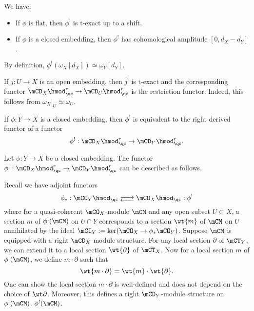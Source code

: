 	\begin{rem}
		We have:
		\begin{itemize}
			\item If $\phi$ is flat, then $\phi^!$ is t-exact up to a shift.
			\item If $\phi$ is a closed embedding, then $\phi^!$ has cohomological amplitude $[0,d_X-d_Y]$.
		\end{itemize}
	\end{rem}

	\begin{exam}
		By definition, $\phi^!(\omega_X[d_X])\simeq \omega_Y[d_Y]$.
	\end{exam}

	\begin{exam}
		If $j:U \to X$ is an open embedding, then $j^!$ is t-exact and the corresponding functor $\mCD_X\hmod^r_\qc\to \mCD_U\hmod^r_\qc$ is the restriction functor. Indeed, this follows from $\omega_X|_{U} \simeq \omega_U$.
	\end{exam}

	\begin{facts}
		If $\phi:Y \to X$ is a closed embedding, then $\phi^!$ is equivalent to the right derived functor of a functor
		\[
			\phi^!: \mCD_X\hmod^r_\qc \to \mCD_Y\hmod^r_\qc.
		\]
	\end{facts}

	\begin{constr}
		Let $\phi:Y \to X$ be a closed embedding. The functor $\phi^!: \mCD_X\hmod^r_\qc \to \mCD_Y\hmod^r_\qc$ can be described as follows. 

		Recall we have adjoint functors
		\[
			\phi_*: \mCO_Y\hmod_\qc\adj \mCO_X\hmod_\qc : \phi^! 
		\]
		where for a quasi-coherent $\mCO_X$-module $\mCM$ and any open subset $U\subset X$, a section $m$ of $\phi^!(\mCM)$ on $U\cap Y$ corresponds to a section $\wt{m}$ of $\mCM$ on $U$ annihilated by the ideal $\mCI_Y:=\ker(\mCO_X \to \phi_*\mCO_Y)$. Suppose $\mCM$ is equipped with a right $\mCD_X$-module structure. For any local section $\partial$ of $\mCT_Y$, we can extend it to a local section $\wt{\partial}$ of $\mCT_X$. Now for a local section $m$ of $\phi^!(\mCM)$, we define $m\cdot \partial$ such that
		\[
			\wt{m\cdot \partial} = \wt{m} \cdot \wt{\partial}.
		\]
		One can show the local section $m\cdot \partial$ is well-defined and does not depend on the choice of $\wt\partial$. Moreover, this defines a right $\mCD_Y$-module structure on $\phi^!(\mCM)$. $\phi^!(\mCM)$.

	\end{constr}

